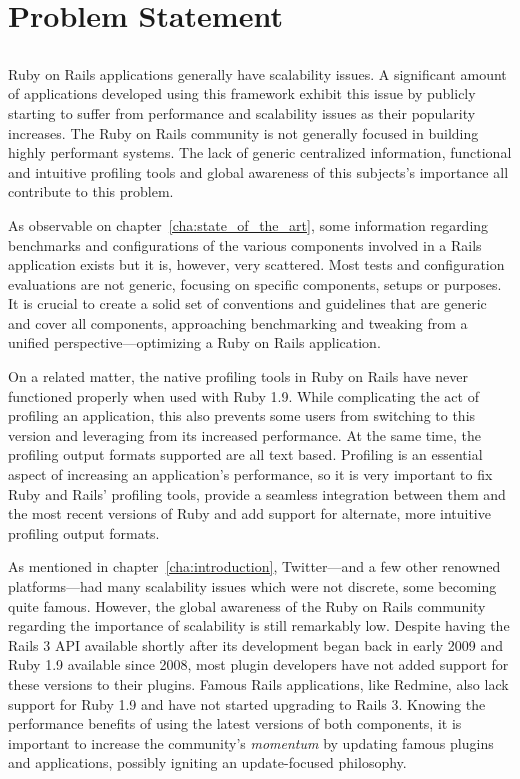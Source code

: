 \chapter{Problem Statement} %
\label{cha:problem_statement}

\section*{} %
Ruby on Rails applications generally have scalability issues. A significant amount of applications developed using this framework exhibit this issue by publicly starting to suffer from performance and scalability issues as their popularity increases. The Ruby on Rails community is not generally focused in building highly performant systems. The lack of generic centralized information, functional and intuitive profiling tools and global awareness of this subjects's importance all contribute to this problem.

As observable on chapter~\ref{cha:state_of_the_art}, some information regarding benchmarks and configurations of the various components involved in a Rails application exists but it is, however, very scattered. Most tests and configuration evaluations are not generic, focusing on specific components, setups or purposes. It is crucial to create a solid set of conventions and guidelines that are generic and cover all components, approaching benchmarking and tweaking from a unified perspective---optimizing a Ruby on Rails application.

On a related matter, the native profiling tools in Ruby on Rails have never functioned properly when used with Ruby 1.9. While complicating the act of profiling an application, this also prevents some users from switching to this version and leveraging from its increased performance. At the same time, the profiling output formats supported are all text based. Profiling is an essential aspect of increasing an application's performance, so it is very important to fix Ruby and Rails' profiling tools, provide a seamless integration between them and the most recent versions of Ruby and add support for alternate, more intuitive profiling output formats.

As mentioned in chapter~\ref{cha:introduction}, Twitter---and a few other renowned platforms---had many scalability issues which were not discrete, some becoming quite famous. However, the global awareness of the Ruby on Rails community regarding the importance of scalability is still remarkably low. Despite having the Rails 3 API available shortly after its development began back in early 2009 and Ruby 1.9 available since 2008, most plugin developers have not added support for these versions to their plugins. Famous Rails applications, like Redmine, also lack support for Ruby 1.9 and have not started upgrading to Rails 3. Knowing the performance benefits of using the latest versions of both components, it is important to increase the community's \textit{momentum} by updating famous plugins and applications, possibly igniting an update-focused philosophy.

